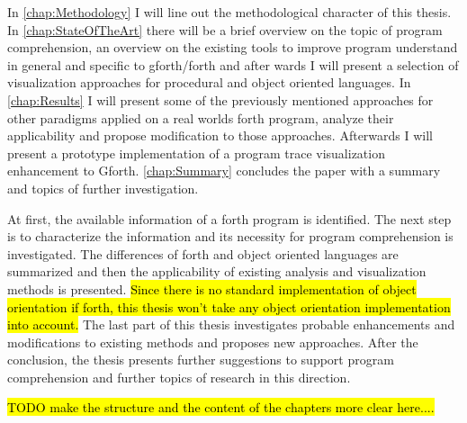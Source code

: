 In \autoref{chap:Methodology} I will line out the methodological character of this thesis. In \autoref{chap:StateOfTheArt} there will be a brief overview on the topic of program comprehension, an overview on the existing tools to improve program understand in general and specific to gforth/forth and after wards I will present a selection of visualization approaches for procedural and object oriented languages. In \autoref{chap:Results} I will present some of the previously mentioned approaches for other paradigms applied on a real worlds forth program, analyze their applicability and propose modification to those approaches. Afterwards I will present a prototype implementation of a program trace visualization enhancement to Gforth. \autoref{chap:Summary} concludes the paper with a summary and topics of further investigation.


At first, the available information of a forth program is identified. The next step is to characterize the information and its necessity for program comprehension is investigated. The differences of forth and object oriented languages are summarized and then the applicability of existing analysis and visualization methods is presented. \hl{Since there is no standard implementation of object orientation if forth, this thesis won't take any object orientation implementation into account.}
The last part of this thesis investigates probable enhancements and modifications to existing methods and proposes new approaches.
After the conclusion, the thesis presents further suggestions to support program comprehension and further topics of research in this direction.

\hl{TODO make the structure and the content of the chapters more clear here....}